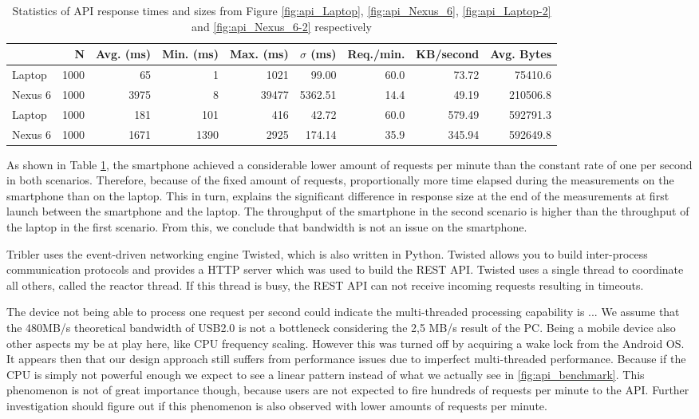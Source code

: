 \begin{table}[H]
  \begin{tabular}{l | *{8}{r}} \hline
  	  & N & Avg. (ms) & Min. (ms) & Max. (ms) & $\sigma$ (ms) & Req./min. & KB/second & Avg. Bytes \\ \hline \hline
  	 Laptop   & 1000 & 65     & 1       & 1021 & 99.00 & 60.0 & 73.72 & 75410.6 \\ \hline
  	 Nexus 6 & 1000 & 3975 & 8       & 39477 & 5362.51 & 14.4 & 49.19 & 210506.8 \\ \hline
  	 Laptop   & 1000 & 181   & 101   & 416   & 42.72   & 60.0 & 579.49 & 592791.3 \\ \hline
  	 Nexus 6 & 1000 & 1671 & 1390 & 2925 & 174.14 & 35.9 & 345.94 & 592649.8 \\ \hline
  \end{tabular}
  \caption{Statistics of API response times and sizes from Figure \ref{fig:api_Laptop}, \ref{fig:api_Nexus_6}, \ref{fig:api_Laptop-2} and \ref{fig:api_Nexus_6-2} respectively}
  \label{table:api_benchmark}
\end{table}
As shown in Table \ref{table:api_benchmark}, the smartphone achieved a considerable lower amount of requests per minute than the constant rate of one per second in both scenarios.
Therefore, because of the fixed amount of requests, proportionally more time elapsed during the measurements on the smartphone than on the laptop.
This in turn, explains the significant difference in response size at the end of the measurements at first launch between the smartphone and the laptop.
The throughput of the smartphone in the second scenario is higher than the throughput of the laptop in the first scenario.
From this, we conclude that bandwidth is not an issue on the smartphone.


Tribler uses the event-driven networking engine Twisted, which is also written in Python.
Twisted allows you to build inter-process communication protocols and provides a HTTP server which was used to build the REST API.
Twisted uses a single thread to coordinate all others, called the reactor thread.
If this thread is busy, the REST API can not receive incoming requests resulting in timeouts.


The device not being able to process one request per second could indicate the multi-threaded processing capability is ...
We assume that the 480MB/s theoretical bandwidth of USB2.0 is not a bottleneck considering the 2,5 MB/s result of the PC.
Being a mobile device also other aspects my be at play here, like CPU frequency scaling.
However this was turned off by acquiring a wake lock from the Android OS.
It appears then that our design approach still suffers from performance issues due to imperfect multi-threaded performance.
Because if the CPU is simply not powerful enough we expect to see a linear pattern instead of what we actually see in \ref{fig:api_benchmark}.
This phenomenon is not of great importance though, because users are not expected to fire hundreds of requests per minute to the API.
Further investigation should figure out if this phenomenon is also observed with lower amounts of requests per minute.



